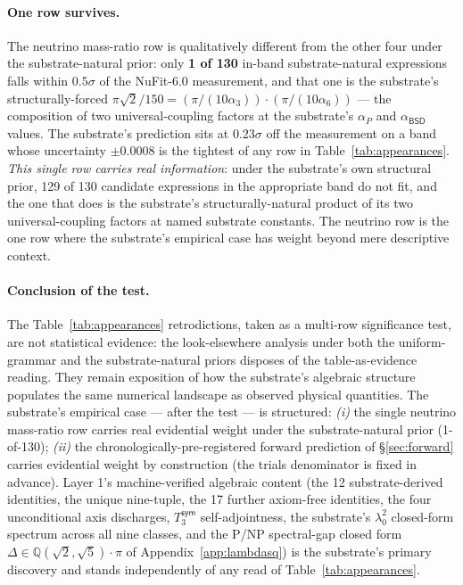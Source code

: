 \documentclass[11pt,a4paper]{amsart}
\theoremstyle{plain}
\theoremstyle{definition}
\begin{document}
\paragraph{One row survives.} The neutrino mass-ratio row is qualitatively different from the other four under the substrate-natural prior: only \textbf{1 of 130} in-band substrate-natural expressions falls within $0.5\sigma$ of the NuFit-6.0 measurement, and that one is the substrate's structurally-forced $\pi\sqrt{2}/150 = (\pi/(10\alpha_3)) \cdot (\pi/(10\alpha_6))$ --- the composition of two universal-coupling factors at the substrate's $\alpha_P$ and $\alpha_{\textsf{BSD}}$ values. The substrate's prediction sits at $0.23\sigma$ off the measurement on a band whose uncertainty $\pm 0.0008$ is the tightest of any row in Table~\ref{tab:appearances}. \emph{This single row carries real information}: under the substrate's own structural prior, 129 of 130 candidate expressions in the appropriate band do not fit, and the one that does is the substrate's structurally-natural product of its two universal-coupling factors at named substrate constants. The neutrino row is the one row where the substrate's empirical case has weight beyond mere descriptive context.

\paragraph{Conclusion of the test.} The Table~\ref{tab:appearances} retrodictions, taken as a multi-row significance test, are not statistical evidence: the look-elsewhere analysis under both the uniform-grammar and the substrate-natural priors disposes of the table-as-evidence reading. They remain exposition of how the substrate's algebraic structure populates the same numerical landscape as observed physical quantities. The substrate's empirical case --- after the test --- is structured: \emph{(i)} the single neutrino mass-ratio row carries real evidential weight under the substrate-natural prior (1-of-130); \emph{(ii)} the chronologically-pre-registered forward prediction of \S\ref{sec:forward} carries evidential weight by construction (the trials denominator is fixed in advance). Layer 1's machine-verified algebraic content (the 12 substrate-derived identities, the unique nine-tuple, the 17 further axiom-free identities, the four unconditional axis discharges, $T_3^{\textsf{sym}}$ self-adjointness, the substrate's $\lambda_0^2$ closed-form spectrum across all nine classes, and the P/NP spectral-gap closed form $\Delta \in \mathbb{Q}(\sqrt{2}, \sqrt{5})\cdot\pi$ of Appendix~\ref{app:lambdasq}) is the substrate's primary discovery and stands independently of any read of Table~\ref{tab:appearances}.
\end{document}
